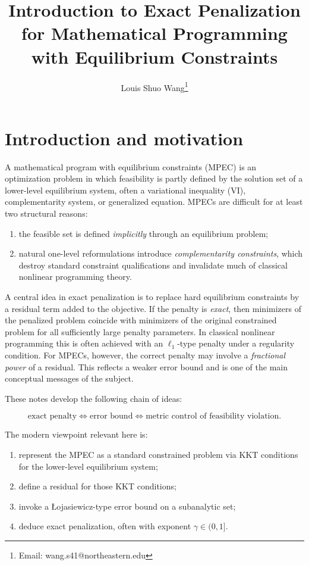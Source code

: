 \documentclass[pdflatex,sn-mathphys-num]{sn-jnl}%
\title{Introduction to Exact Penalization for Mathematical Programming with Equilibrium Constraints}
\author{Louis Shuo Wang\thanks{Email: wang.s41@northeastern.edu}}
\affil{Department of Mathematics, Northeastern University, Boston, 02115, MA, USA}
\theoremstyle{definition}
\begin{document}
\maketitle

\section{Introduction and motivation}

A mathematical program with equilibrium constraints (MPEC) is an optimization problem in which feasibility is partly defined by the solution set of a lower-level equilibrium system, often a variational inequality (VI), complementarity system, or generalized equation. MPECs are difficult for at least two structural reasons:

\begin{enumerate}[label=\arabic*.]
    \item the feasible set is defined \emph{implicitly} through an equilibrium problem;
    \item natural one-level reformulations introduce \emph{complementarity constraints}, which destroy standard constraint qualifications and invalidate much of classical nonlinear programming theory.
\end{enumerate}

A central idea in exact penalization is to replace hard equilibrium constraints by a residual term added to the objective. If the penalty is \emph{exact}, then minimizers of the penalized problem coincide with minimizers of the original constrained problem for all sufficiently large penalty parameters. In classical nonlinear programming this is often achieved with an $\ell_1$-type penalty under a regularity condition. For MPECs, however, the correct penalty may involve a \emph{fractional power} of a residual. This reflects a weaker error bound and is one of the main conceptual messages of the subject.

These notes develop the following chain of ideas:

\[
\text{exact penalty}
\Longleftrightarrow
\text{error bound}
\Longleftrightarrow
\text{metric control of feasibility violation}.
\]

The modern viewpoint relevant here is:
\begin{enumerate}[label=(\roman*)]
    \item represent the MPEC as a standard constrained problem via KKT conditions for the lower-level equilibrium system;
    \item define a residual for those KKT conditions;
    \item invoke a Łojasiewicz-type error bound on a subanalytic set;
    \item deduce exact penalization, often with exponent $\gamma \in (0,1]$.
\end{enumerate}
\end{document}
